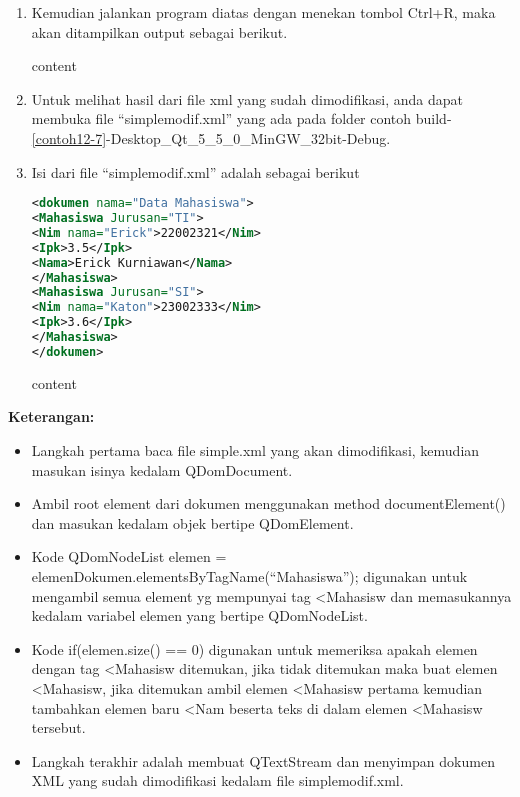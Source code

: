 \begin{enumerate}
\item
  Kemudian jalankan program diatas dengan menekan tombol Ctrl+R, maka
  akan ditampilkan output sebagai berikut.
  \begin{lcverbatim}
  	content
  \end{lcverbatim}
\item
  Untuk melihat hasil dari file xml yang sudah dimodifikasi, anda dapat
  membuka file ``simplemodif.xml'' yang ada pada folder contoh
  build-\ref{contoh12-7}-Desktop\_Qt\_5\_5\_0\_MinGW\_32bit-Debug.
\item
  Isi dari file ``simplemodif.xml'' adalah sebagai berikut

\begin{lstlisting}[language=xml]
<dokumen nama="Data Mahasiswa">
<Mahasiswa Jurusan="TI">
<Nim nama="Erick">22002321</Nim>
<Ipk>3.5</Ipk>
<Nama>Erick Kurniawan</Nama>
</Mahasiswa>
<Mahasiswa Jurusan="SI">
<Nim nama="Katon">23002333</Nim>
<Ipk>3.6</Ipk>
</Mahasiswa>
</dokumen>
\end{lstlisting}
\begin{lcverbatim}
	content
\end{lcverbatim}
\end{enumerate}

\textbf{Keterangan:}

\begin{itemize}

\item
  Langkah pertama baca file simple.xml yang akan dimodifikasi, kemudian
  masukan isinya kedalam QDomDocument.
\item
  Ambil root element dari dokumen menggunakan method documentElement()
  dan masukan kedalam objek bertipe QDomElement.
\item
  Kode QDomNodeList elemen =
  elemenDokumen.elementsByTagName(``Mahasiswa''); digunakan untuk
  mengambil semua element yg mempunyai tag \textless{}Mahasisw dan
  memasukannya kedalam variabel elemen yang bertipe QDomNodeList.
\item
  Kode if(elemen.size() == 0) digunakan untuk memeriksa apakah elemen
  dengan tag \textless{}Mahasisw ditemukan, jika tidak ditemukan maka
  buat elemen \textless{}Mahasisw, jika ditemukan ambil elemen
  \textless{}Mahasisw pertama kemudian tambahkan elemen baru
  \textless{}Nam beserta teks di dalam elemen \textless{}Mahasisw
  tersebut.
\item
  Langkah terakhir adalah membuat QTextStream dan menyimpan dokumen XML
  yang sudah dimodifikasi kedalam file simplemodif.xml.
\end{itemize}

